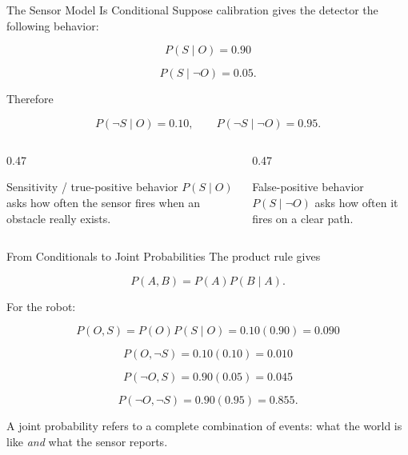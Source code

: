 \documentclass[aspectratio=169,10pt]{beamer}
\begin{document}
\begin{frame}[shrink=10]{The Sensor Model Is Conditional}
  Suppose calibration gives the detector the following behavior:

  \[
    P(S\mid O)=0.90
  \]

  \[
    P(S\mid \neg O)=0.05.
  \]

  Therefore

  \[
    P(\neg S\mid O)=0.10,
    \qquad
    P(\neg S\mid \neg O)=0.95.
  \]

  \begin{columns}[T,onlytextwidth]
    \begin{column}{0.47\textwidth}
      \begin{block}{Sensitivity / true-positive behavior}
        $P(S\mid O)$ asks how often the sensor fires when an obstacle really exists.
      \end{block}
    \end{column}
    \begin{column}{0.47\textwidth}
      \begin{block}{False-positive behavior}
        $P(S\mid \neg O)$ asks how often it fires on a clear path.
      \end{block}
    \end{column}
  \end{columns}
\end{frame}

\begin{frame}[shrink=10]{From Conditionals to Joint Probabilities}
  The product rule gives

  \[
    P(A,B)=P(A)P(B\mid A).
  \]

  For the robot:

  \[
    P(O,S)=P(O)P(S\mid O)=0.10(0.90)=0.090
  \]

  \[
    P(O,\neg S)=0.10(0.10)=0.010
  \]

  \[
    P(\neg O,S)=0.90(0.05)=0.045
  \]

  \[
    P(\neg O,\neg S)=0.90(0.95)=0.855.
  \]

  \begin{keyidea}
    A joint probability refers to a complete combination of events: what the world is like \emph{and} what the sensor reports.
  \end{keyidea}
\end{frame}
\end{document}
